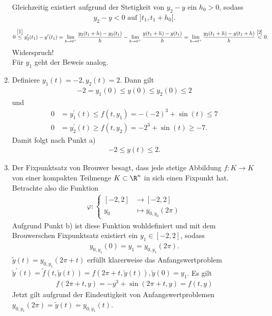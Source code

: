 \begin{solution}
\begin{enumerate}[label = \textbf{\alph*)}]
  Gleichzeitig existiert aufgrund der Stetigkeit von $y_2- y$ ein $h_0 > 0$, sodass
  \begin{align}\label{2}
    y_2 - y < 0 \text{ auf } ]t_1,t_1+h_0[.
  \end{align}
    \begin{align*}
      0 \stackrel{\eqref{1}}{\leq} y_2^{\prime}(t_1) - y^{\prime}(t_1)
      = \lim_{h \to 0^+}\frac{y_2(t_1 + h) - y_2(t_1)}{h} - \lim_{h \to 0^+}\frac{y(t_1 + h) - y(t_1)}{h}
      = \lim_{h \to 0^+}\frac{y_2(t_1 + h) - y(t_1 + h)}{h}
      \stackrel{\eqref{2}}{<} 0.
    \end{align*}
    Widerspruch! \\
  Für $y_1$ geht der Beweis analog.
  \item Definiere $y_1(t) = -2, y_2(t) = 2$. Dann gilt
  \begin{align*}
    -2 = y_1(0) \leq y(0) \leq y_2(0) \leq 2
  \end{align*}
  und
  \begin{align*}
    0 &= y_1^{\prime}(t) \leq f(t,y_1) = -(-2)^3 + \sin(t) \leq 7 \\
    0 &= y_2^{\prime}(t) \geq f(t,y_2) = -2^3 + \sin(t) \geq -7.
  \end{align*}
  Damit folgt nach Punkt a)
  \begin{align*}
    -2 \leq y(t) \leq 2.
  \end{align*}
  \item Der Fixpunktsatz von Brouwer besagt, dass jede stetige Abbildung $f: K \to K$
  von einer kompakten Teilmenge $K \subset \R^n$ in sich einen Fixpunkt hat.
  Betrachte also die Funktion
  \begin{align*}
    \varphi: \begin{cases}
      [-2,2] &\to [-2,2] \\
      y_0 &\mapsto y_{0,y_0}(2\pi)
    \end{cases}
  \end{align*}
  Aufgrund Punkt b) ist diese Funktion wohldefiniert und mit dem Brouwerschen Fixpunktsatz
  existiert ein $y_1 \in [-2,2]$, sodass
  \begin{align*}
    y_{0,y_1}(0) = y_1 = y_{0,y_1}(2\pi).
  \end{align*}
  $\widetilde{y}(t) = y_{0,y_1}(2\pi + t)$ erfüllt klarerweise das Anfangswertproblem $\widetilde{y}^{\prime}(t) =
  \widetilde{f}(t,\widetilde{y}(t)) = f(2\pi+t,\widetilde{y}(t)),
  \widetilde{y}(0) = y_1$. Es gilt
  \begin{align*}
    f(2\pi + t,y) = -y^3 + \sin(2\pi + t, y) = f(t,y)
  \end{align*}
  Jetzt gilt aufgrund der Eindeutigkeit von Anfangswertproblemen $y_{0,y_1}(2\pi) = \widetilde{y}(t) = y_{0,y_1}(t)$.
\end{enumerate}
\end{solution}
